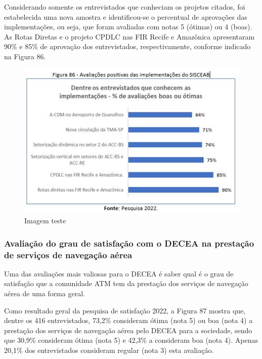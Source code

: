 \documentclass[
]{book}
\begin{document}
Considerando somente os entrevistados que conheciam os projetos citados, foi estabelecida uma nova amostra e identificou-se o percentual de aprovações das implementações, ou seja, que foram avaliadas com notas 5 (ótimas) ou 4 (boas). As Rotas Diretas e o projeto CPDLC nas FIR Recife e Amazônica apresentaram 90\% e 85\% de aprovação dos entrevistados, respectivamente, conforme indicado na Figura 86.

\begin{figure}
\centering
\includegraphics{imagens/fig73.jpg}
\caption{Imagem teste}
\end{figure}

\hypertarget{avaliauxe7uxe3o-do-grau-de-satisfauxe7uxe3o-com-o-decea-na-prestauxe7uxe3o-de-serviuxe7os-de-navegauxe7uxe3o-auxe9rea}{%
\subsubsection{Avaliação do grau de satisfação com o DECEA na prestação de serviços de navegação aérea}\label{avaliauxe7uxe3o-do-grau-de-satisfauxe7uxe3o-com-o-decea-na-prestauxe7uxe3o-de-serviuxe7os-de-navegauxe7uxe3o-auxe9rea}}

Uma das avaliações mais valiosas para o DECEA é saber qual é o grau de satisfação que a comunidade ATM tem da prestação dos serviços de navegação aérea de uma forma geral.

Como resultado geral da pesquisa de satisfação 2022, a Figura 87 mostra que, dentre os 416 entrevistados, 73,2\% consideram ótima (nota 5) ou boa (nota 4) a prestação dos serviços de navegação aérea pelo DECEA para a sociedade, sendo que 30,9\% consideram ótima (nota 5) e 42,3\% a consideram boa (nota 4). Apenas 20,1\% dos entrevistados consideram regular (nota 3) esta avaliação.
\end{document}
